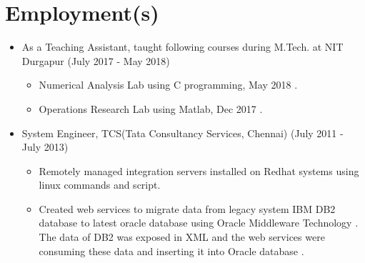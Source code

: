 \documentclass[a4paper,10pt]{article}
\begin{document}
	\section{Employment(s)}
	\begin{itemize}
			\item As  a Teaching Assistant, taught following courses during M.Tech. at NIT Durgapur (July 2017 - May 2018)
                \begin{itemize}
                    \item Numerical Analysis Lab using C programming, May 2018 .
                    \item Operations Research Lab using Matlab, Dec 2017 .
                \end{itemize}
            \item System Engineer, TCS(Tata Consultancy Services, Chennai) (July 2011 - July 2013)
		        \begin{itemize}
			    	\item Remotely managed integration servers installed on Redhat systems using linux commands and script.
					\item Created web services to migrate data from legacy system IBM DB2 database to latest oracle database using Oracle Middleware Technology .
					The data  of DB2 was exposed in XML  and the web services were consuming these data and inserting it into Oracle database .
			\end{itemize}
	\end{itemize}
    
    
\end{document}
